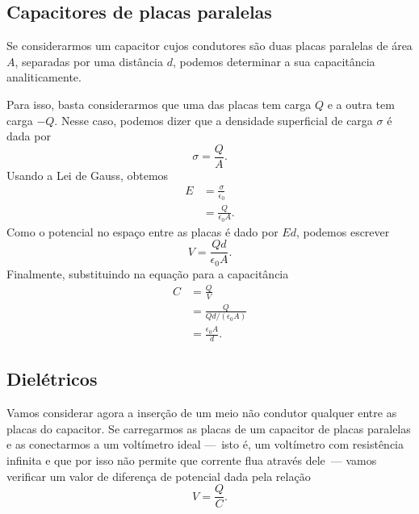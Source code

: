 \subsection{Capacitores de placas paralelas}

Se considerarmos um capacitor cujos condutores são duas placas paralelas de área $A$, separadas por uma distância $d$, podemos determinar a sua capacitância analiticamente.

Para isso, basta considerarmos que uma das placas tem carga $Q$ e a outra tem carga $-Q$. Nesse caso, podemos dizer que a densidade superficial de carga $\sigma$ é dada por
\begin{equation}
	\sigma = \frac{Q}{A}.
\end{equation}
%
Usando a Lei de Gauss, obtemos
\begin{align}
	E &= \frac{\sigma}{\epsilon_0} \\
	&= \frac{Q}{\epsilon_0 A}.
\end{align}
%
Como o potencial no espaço entre as placas é dado por $Ed$, podemos escrever
\begin{equation}
	V = \frac{Qd}{\epsilon_0 A}.
\end{equation}
%
Finalmente, substituindo na equação para a capacitância
\begin{align}
	C &= \frac{Q}{V} \\
	&= \frac{Q}{Qd/(\epsilon_0 A)} \\
	&= \frac{\epsilon_0 A}{d}.
\end{align}

\subsection{Dielétricos}

Vamos considerar agora a inserção de um meio não condutor qualquer entre as placas do capacitor. Se carregarmos as placas de um capacitor de placas paralelas e as conectarmos a um voltímetro ideal ---~isto é, um voltímetro com resistência infinita e que por isso não permite que corrente flua através dele~--- vamos verificar um valor de diferença de potencial dada pela relação
\begin{equation}
    V = \frac{Q}{C}.
\end{equation}

